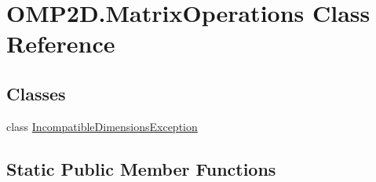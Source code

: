 \hypertarget{classOMP2D_1_1MatrixOperations}{\section{O\-M\-P2\-D.\-Matrix\-Operations Class Reference}
\label{classOMP2D_1_1MatrixOperations}
}
\subsection*{Classes}
\begin{DoxyCompactItemize}
\item 
class \hyperlink{classOMP2D_1_1MatrixOperations_1_1IncompatibleDimensionsException}{Incompatible\-Dimensions\-Exception}
\end{DoxyCompactItemize}
\subsection*{Static Public Member Functions}
